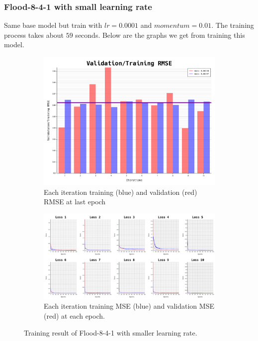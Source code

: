 \documentclass{article}
\begin{document}
\newpage
\subsubsection*{Flood-8-4-1 with small learning rate}
Same base model but train with $lr = 0.0001$ and $momentum = 0.01$.
The training process takes about $59$ seconds.
Below are the graphs we get from training this model. 
\begin{figure}[ht]
	\begin{subfigure}{\textwidth}
		\centering
		\includegraphics[scale=0.3]{flood-8-4-1_3/cv_l}
		\caption{Each iteration training (blue) and validation (red) RMSE at last epoch}
		\label{fig:4a}
	\end{subfigure}
	\begin{subfigure}{\textwidth}
		\includegraphics[width=\textwidth]{flood-8-4-1_3/loss}
		\caption{Each iteration training MSE (blue) and validation MSE (red) at each epoch.}
		\label{fig:4b}
	\end{subfigure}
	\caption{Training result of Flood-8-4-1 with smaller learning rate.}
	\label{fig:4}
\end{figure}
\FloatBarrier
\end{document}
